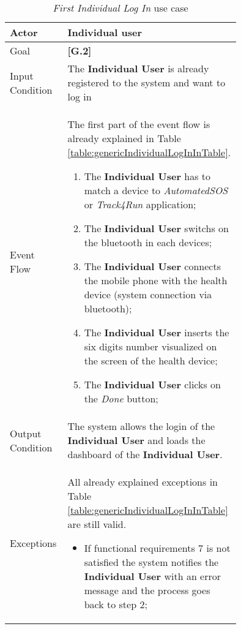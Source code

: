 \begin{center}
\begin{table}
\begin{tabular}{ | l | p{0.75\linewidth} | }
  \hline
    Actor & \textbf{Individual user} \\ \hline
    Goal & \textbf{[G.2]} \\ \hline
    Input Condition & The \textbf{Individual User} is already registered to the system and want to log in \\ \hline
    Event Flow & \begin{minipage}[t]{0.7\textwidth}
      The first part of the event flow is already explained in Table \ref{table:genericIndividualLogInInTable}.
      \begin{enumerate}
        \item The \textbf{Individual User} has to match a device to \textit{AutomatedSOS} or \textit{Track4Run} application;
        \item The \textbf{Individual User} switchs on the bluetooth in each devices;
        \item The \textbf{Individual User} connects the mobile phone with the health device (system connection via bluetooth);
        \item The \textbf{Individual User} inserts the six digits number visualized on the screen of the health device;
        \item The \textbf{Individual User} clicks on the \textit{Done} button;
      \end{enumerate}
    \smallskip
  \end{minipage} \\ \hline
  Output Condition & The system allows the login of the \textbf{Individual User} and loads the dashboard of the \textbf{Individual User}. \\ \hline
  Exceptions & \begin{minipage}[t]{0.7\textwidth}
    All already explained exceptions in Table \ref{table:genericIndividualLogInInTable} are still valid.
    \begin{itemize}
      \smallskip
      \item If functional requirements 7 is not satisfied the system notifies the \textbf{Individual User} with an error message and the process goes back to step 2;
    \end{itemize}
    \smallskip
  \end{minipage}  \\ \hline
\end{tabular}
\caption{\textit{First Individual Log In} use case}
\label{table:firstIndividualLogInInTable}
\end{table}
\end{center}
